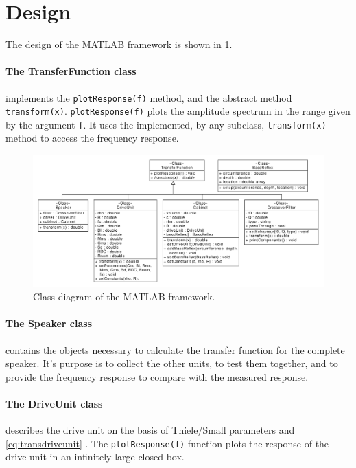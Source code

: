 \section{Design}
The design of the MATLAB framework is shown in \cref{fig:classbdd}.

\paragraph{The TransferFunction class} implements the \texttt{plotResponse(f)} method, and the  abstract method \texttt{transform(x)}.
\texttt{plotResponse(f)} plots the amplitude spectrum in the range given by the argument \texttt{f}.
It uses the implemented, by any subclass, \texttt{transform(x)} method to access the frequency response.

\begin{figure}
	\centering
	\includegraphics[width=\linewidth]{gfx/Design/Class_BDD}
	\caption{Class diagram of the MATLAB framework.}
	\label{fig:classbdd}
\end{figure}

\paragraph{The Speaker class} contains the objects necessary to calculate the transfer function for the complete speaker.
It's purpose is to collect the other units, to test them together, and to provide the frequency response to compare with the measured response.

\paragraph{The DriveUnit class} describes the drive unit on the basis of Thiele/Small parameters \cite{thielesmall} and \cref{eq:transdriveunit} \cite[p.~51]{Elektroakustik}.
The \texttt{plotResponse(f)} function plots the response of the drive unit in an infinitely large closed box.

